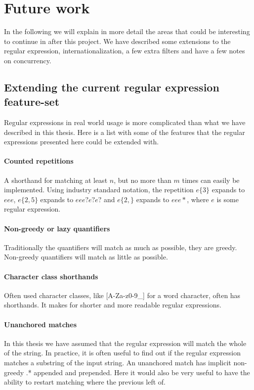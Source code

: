\section{Future work}
\label{sec:future}

In the following we will explain in more detail the areas that could
be interesting to continue in after this project. We have described
some extensions to the regular expression, internationalization, a few
extra filters and have a few notes on concurrency.

\subsection{Extending the current regular expression feature-set}

Regular expressions in real world usage is more complicated than what
we have described in this thesis. Here is a list with some of the
features that the regular expressions presented here could be extended
with.

\paragraph{Counted repetitions} A shorthand for matching at least $n$, but
no more than $m$ times can easily be implemented. Using industry
standard notation, the repetition $e\{3\}$ expands to $eee$,
$e\{2,5\}$ expands to $eee?e?e?$ and $e\{2,\}$ expands to $eee*$,
where $e$ is some regular expression.

\paragraph{Non-greedy or lazy quantifiers} Traditionally the quantifiers will
match as much as possible, they are greedy. Non-greedy quantifiers
will match as little as possible.

\paragraph{Character class shorthands} Often used character classes,
like \textsf{[A-Za-z0-9\_]} for a word character, often has
shorthands. It makes for shorter and more readable regular
expressions.

\paragraph{Unanchored matches} In this thesis we have assumed that the
regular expression will match the whole of the string. In practice, it
is often useful to find out if the regular expression matches a
substring of the input string. An unanchored match has implicit
non-greedy \textsf{.*} appended and prepended. Here it would also be
very useful to have the ability to restart matching where the previous
left of. 

